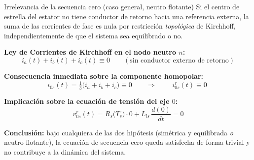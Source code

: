\documentclass[aspectratio=169,t]{beamer}
\begin{document}
\begin{frame}{Irrelevancia de la secuencia cero (caso general, neutro flotante)}
{\small\color{uncGray}Si el centro de estrella del estator no tiene conductor de retorno hacia una referencia externa, la suma de las corrientes de fase es nula por restricción \emph{topológica} de Kirchhoff, independientemente de que el sistema sea equilibrado o no.}\par
\vspace{4mm}

\textbf{Ley de Corrientes de Kirchhoff en el nodo neutro $n$:}
\begin{equation*}
i_a(t) + i_b(t) + i_c(t) \equiv 0
\qquad (\text{sin conductor externo de retorno})
\end{equation*}

\textbf{Consecuencia inmediata sobre la componente homopolar:}
\begin{equation*}
i_{0s}(t) = \tfrac{1}{3}\big(i_a + i_b + i_c\big) \equiv 0
\qquad\Longrightarrow\qquad
\boxed{\;i_{0s}^{r}(t) \equiv 0\;}
\end{equation*}

\textbf{Implicación sobre la ecuación de tensión del eje $0$:}
\begin{equation*}
v_{0s}^{r}(t) = R_s\!\big(T_s^\circ\big)\cdot 0 + L_{ls}\,\frac{d(0)}{dt} = 0
\end{equation*}

{\small \textbf{Conclusión:} bajo cualquiera de las dos hipótesis (simétrica y equilibrada \emph{o} neutro flotante), la ecuación de secuencia cero queda satisfecha de forma trivial y no contribuye a la dinámica del sistema.}
\end{frame}
\end{document}
